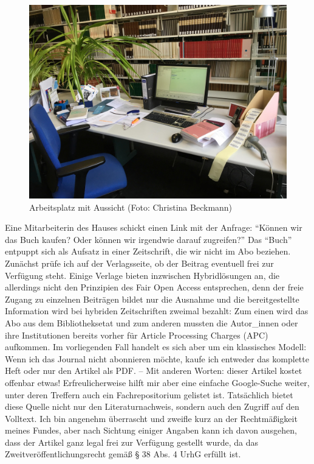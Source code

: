 \documentclass[a4paper,
fontsize=11pt,
oneside,
numbers=noperiodatend,
parskip=half-,
bibliography=totoc,
final
]{scrartcl}
\begin{document}
\begin{figure}
\centering
\includegraphics{img/Beckmann_1.jpg}
\caption{Arbeitsplatz mit Aussicht (Foto: Christina Beckmann)}
\end{figure}

Eine Mitarbeiterin des Hauses schickt einen Link mit der Anfrage:
\enquote{Können wir das Buch kaufen? Oder können wir irgendwie darauf
zugreifen?} Das \enquote{Buch} entpuppt sich als Aufsatz in einer
Zeitschrift, die wir nicht im Abo beziehen. Zunächst prüfe ich auf der
Verlagsseite, ob der Beitrag eventuell frei zur Verfügung steht. Einige
Verlage bieten inzwischen Hybridlösungen an, die allerdings nicht den
Prinzipien des Fair Open Access entsprechen, denn der freie Zugang zu
einzelnen Beiträgen bildet nur die Ausnahme und die bereitgestellte
Information wird bei hybriden Zeitschriften zweimal bezahlt: Zum einen
wird das Abo aus dem Bibliotheksetat und zum anderen mussten die
Autor\_innen oder ihre Institutionen bereits vorher für Article
Processing Charges (APC) aufkommen. Im vorliegenden Fall handelt es sich
aber um ein klassisches Modell: Wenn ich das Journal nicht abonnieren
möchte, kaufe ich entweder das komplette Heft oder nur den Artikel als
PDF. -- Mit anderen Worten: dieser Artikel kostet offenbar etwas!
Erfreulicherweise hilft mir aber eine einfache Google-Suche weiter,
unter deren Treffern auch ein Fachrepositorium gelistet ist. Tatsächlich
bietet diese Quelle nicht nur den Literaturnachweis, sondern auch den
Zugriff auf den Volltext. Ich bin angenehm überrascht und zweifle kurz
an der Rechtmäßigkeit meines Fundes, aber nach Sichtung einiger Angaben
kann ich davon ausgehen, dass der Artikel ganz legal frei zur Verfügung
gestellt wurde, da das Zweitveröffentlichungsrecht gemäß § 38 Abs. 4
UrhG erfüllt ist.
\end{document}
